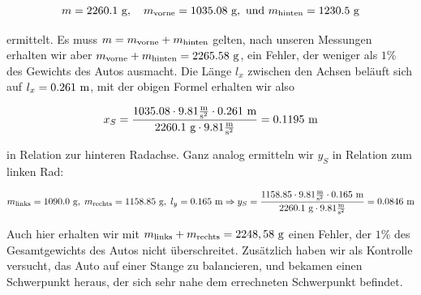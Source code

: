 $$ m = 2260.1 {\textnormal{ g}},\quad m_{\textnormal{vorne}} = 1035.08{\textnormal{ g}}, \textnormal{ und } m_{\textnormal{hinten}} = 1230.5{\textnormal{ g}}$$

ermittelt. Es muss $m = m_{\textnormal{vorne}} + m_{\textnormal{hinten}}$ gelten, nach unseren Messungen erhalten wir aber $m_{\textnormal{vorne}} + m_{\textnormal{hinten}} = 2265.58 {\textnormal{ g}}$, ein Fehler, der weniger als $1\%$ des Gewichts des Autos ausmacht.
Die Länge $l_x$ zwischen den Achsen beläuft sich auf $l_x = 0.261 {\textnormal{ m}}$, mit der obigen Formel erhalten wir also 

$$x_S = \frac{1035.08 \cdot 9.81 \frac{\textnormal{m}}{\textnormal{s}^2} \cdot 0.261 {\textnormal{ m}}}{2260.1 {\textnormal{ g}} \cdot 9.81 \frac{\textnormal{m}}{\textnormal{s}^2} } = 0.1195 {\textnormal{ m}} $$

in Relation zur hinteren Radachse. Ganz analog ermitteln wir $y_S$ in Relation zum linken Rad:

$$ m_{\textnormal{links}} = 1090.0 {\textnormal{ g}}, \; m_{\textnormal{rechts}} = 1158.85 {\textnormal{ g}},\; l_y = 0.165 {\textnormal{ m}} 
 \Rightarrow y_S = \frac{1158.85 \cdot 9.81 \frac{\textnormal{m}}{\textnormal{s}^2} \cdot 0.165 {\textnormal{ m}}}{2260.1 {\textnormal{ g}} \cdot 9.81 \frac{\textnormal{m}}{\textnormal{s}^2} } = 0.0846 {\textnormal{ m}}$$

Auch hier erhalten wir mit $m_{\textnormal{links}} + m_{\textnormal{rechts}} = 2248,58 {\textnormal{ g}}$ einen Fehler, der $1\%$ des Gesamtgewichts des Autos nicht überschreitet. Zusätzlich haben wir als Kontrolle versucht, das Auto auf einer Stange zu balancieren, und bekamen einen Schwerpunkt heraus, der sich sehr nahe dem errechneten Schwerpunkt befindet.
